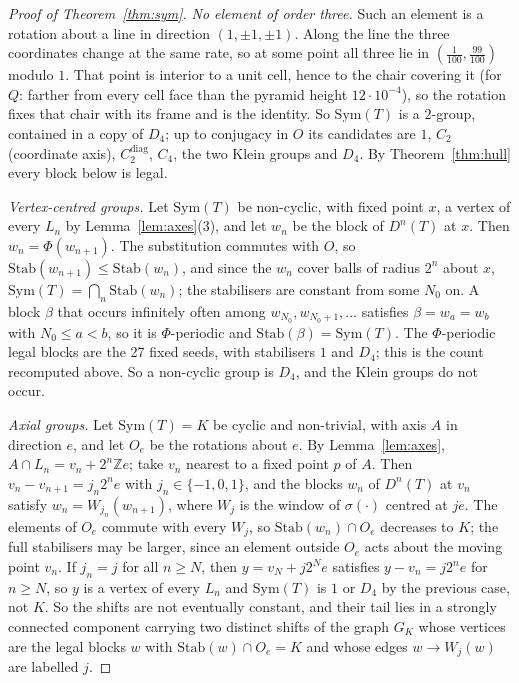 \documentclass[11pt]{article}
\theoremstyle{definition}
\theoremstyle{remark}
\begin{document}
\begin{proof}[Proof of Theorem~\ref{thm:sym}]
\emph{No element of order three.}  Such an element is a rotation about a line in direction $(1,\pm1,\pm1)$.  Along the line
the three coordinates change at the same rate, so at some point all three lie in $(\frac1{100},\frac{99}{100})$ modulo $1$.
That point is interior to a unit cell, hence to the chair covering it (for $Q$: farther from every cell face than the
pyramid height $12\cdot10^{-4}$), so the rotation fixes that chair with its frame and is the identity.  So
$\mathrm{Sym}(T)$ is a $2$-group, contained in a copy of $D_{4}$; up to conjugacy in $O$ its candidates are $1$, $C_{2}$
(coordinate axis), $C_{2}^{\mathrm{diag}}$, $C_{4}$, the two Klein groups and $D_{4}$.  By Theorem~\ref{thm:hull} every
block below is legal.

\emph{Vertex-centred groups.}  Let $\mathrm{Sym}(T)$ be non-cyclic, with fixed point $x$, a vertex of every $L_{n}$ by
Lemma~\ref{lem:axes}(3), and let $w_{n}$ be the block of $D^{n}(T)$ at $x$.  Then $w_{n}=\Phi(w_{n+1})$.  The substitution
commutes with $O$, so $\mathrm{Stab}(w_{n+1})\le\mathrm{Stab}(w_{n})$, and since the $w_{n}$ cover balls of radius $2^{n}$
about $x$, $\mathrm{Sym}(T)=\bigcap_{n}\mathrm{Stab}(w_{n})$; the stabilisers are constant from some $N_{0}$ on.  A block
$\beta$ that occurs infinitely often among $w_{N_{0}},w_{N_{0}+1},\dots$ satisfies $\beta=w_{a}=w_{b}$ with $N_{0}\le a<b$, so it
is $\Phi$-periodic and $\mathrm{Stab}(\beta)=\mathrm{Sym}(T)$.  The $\Phi$-periodic legal blocks are the 27 fixed seeds,
with stabilisers $1$ and $D_{4}$; this is the count recomputed above.  So a non-cyclic group is $D_{4}$, and the Klein groups
do not occur.

\emph{Axial groups.}  Let $\mathrm{Sym}(T)=K$ be cyclic and non-trivial, with axis $A$ in direction $e$, and let $O_{e}$ be
the rotations about $e$.  By Lemma~\ref{lem:axes}, $A\cap L_{n}=v_{n}+2^{n}\mathbb{Z}e$; take $v_{n}$ nearest to a fixed
point $p$ of $A$.  Then $v_{n}-v_{n+1}=j_{n}2^{n}e$ with $j_{n}\in\{-1,0,1\}$, and the blocks $w_{n}$ of $D^{n}(T)$ at $v_{n}$
satisfy $w_{n}=W_{j_{n}}(w_{n+1})$, where $W_{j}$ is the window of $\sigma(\cdot)$ centred at $je$.  The elements of $O_{e}$
commute with every $W_{j}$, so $\mathrm{Stab}(w_{n})\cap O_{e}$ decreases to $K$; the full stabilisers may be larger, since
an element outside $O_{e}$ acts about the moving point $v_{n}$.  If $j_{n}=j$ for all $n\ge N$, then $y=v_{N}+j2^{N}e$
satisfies $y-v_{n}=j2^{n}e$ for $n\ge N$, so $y$ is a vertex of every $L_{n}$ and $\mathrm{Sym}(T)$ is $1$ or $D_{4}$ by the
previous case, not $K$.  So the shifts are not eventually constant, and their tail lies in a strongly connected component
carrying two distinct shifts of the graph $G_{K}$ whose vertices are the legal blocks $w$ with
$\mathrm{Stab}(w)\cap O_{e}=K$ and whose edges $w\to W_{j}(w)$ are labelled $j$.


\end{proof}
\end{document}

